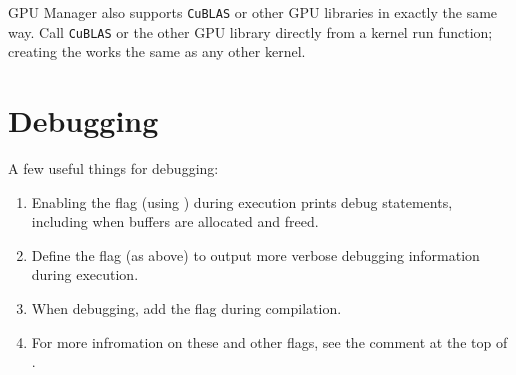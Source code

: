 GPU Manager also supports \texttt{CuBLAS} or other GPU libraries in exactly the same way.
Call \texttt{CuBLAS} or the other GPU library directly from a kernel run function;
creating the  works the same as any other kernel.


\section{Debugging}

A few useful things for debugging:

\begin{enumerate}
\item Enabling the  flag
(using ) during execution prints debug
statements, including when buffers are allocated and freed.

\item Define the  flag (as above) to output more verbose
debugging information during execution.

\item When debugging, add the flag  during compilation.

\item For more infromation on these and other flags, see the comment at the top
of .
\end{enumerate}
